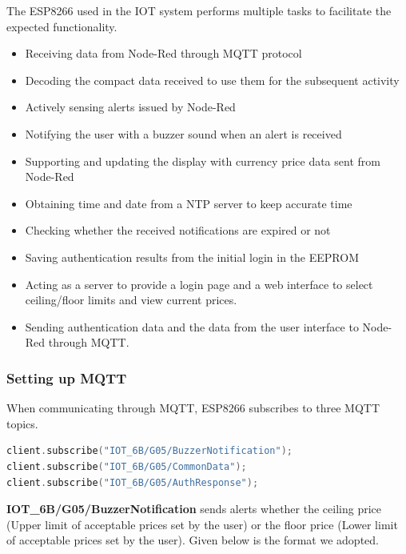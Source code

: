 The ESP8266 used in the IOT system performs multiple tasks to facilitate the expected functionality.

\begin{itemize}[itemsep=-1.7mm]

\item Receiving data from Node-Red through MQTT protocol
\item Decoding the compact data received to use them for the subsequent activity
\item Actively sensing alerts issued by Node-Red
\item Notifying the user with a buzzer sound when an alert is received
\item Supporting and updating the display with currency price data sent from Node-Red
\item Obtaining time and date from a NTP server to keep accurate time
\item Checking whether the received notifications are expired or not
\item Saving authentication results from the initial login in the EEPROM
\item Acting as a server to provide a login page and a web interface to select ceiling/floor limits and view current prices.
\item Sending authentication data and the data from the user interface to Node-Red through MQTT.

\end{itemize}

\subsubsection{Setting up MQTT}

When communicating through MQTT, ESP8266 subscribes to three MQTT topics.\\

\begin{lstlisting}[language=C++]
client.subscribe("IOT_6B/G05/BuzzerNotification");
client.subscribe("IOT_6B/G05/CommonData");
client.subscribe("IOT_6B/G05/AuthResponse");
\end{lstlisting}

\vspace{\baselineskip}

\textbf{IOT\_6B/G05/BuzzerNotification} sends alerts whether the ceiling price (Upper limit of acceptable prices set by the user)  or the floor price (Lower limit of acceptable prices set by the user). Given below is the format we adopted.\\


